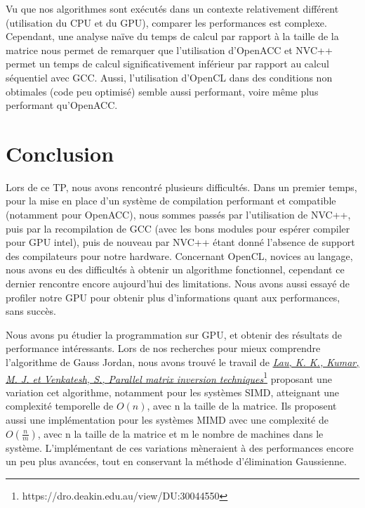 \documentclass[a4paper, french]{article}
\begin{document}
Vu que nos algorithmes sont exécutés dans un contexte relativement différent (utilisation du CPU et du GPU), comparer les performances est complexe. Cependant, une analyse naïve du temps de calcul par rapport à la taille de la matrice nous permet de remarquer que l'utilisation d'OpenACC et NVC++ permet un temps de calcul significativement inférieur par rapport au calcul séquentiel avec GCC. Aussi, l'utilisation d'OpenCL dans des conditions non obtimales (code peu optimisé) semble aussi performant, voire même plus performant qu'OpenACC.

\section{Conclusion}

Lors de ce TP, nous avons rencontré plusieurs difficultés. Dans un premier temps, pour la mise en place d'un système de compilation performant et compatible (notamment pour OpenACC), nous sommes passés par l'utilisation de NVC++, puis par la recompilation de GCC (avec les bons modules pour espérer compiler pour GPU intel), puis de nouveau par NVC++ étant donné l'absence de support des compilateurs pour notre hardware. Concernant OpenCL, novices au langage, nous avons eu des difficultés à obtenir un algorithme fonctionnel, cependant ce dernier rencontre encore aujourd'hui des limitations. Nous avons aussi essayé de profiler notre GPU pour obtenir plus d'informations quant aux performances, sans succès.

Nous avons  pu étudier la programmation sur GPU, et obtenir des résultats de performance intéressants.
Lors de nos recherches pour mieux comprendre l'algorithme de Gauss Jordan, nous avons trouvé le travail de \href{https://dro.deakin.edu.au/view/DU:30044550}{\textit{\underline{Lau, K. K., Kumar, M. J. et Venkatesh, S., Parallel matrix inversion techniques}}}\footnote{https://dro.deakin.edu.au/view/DU:30044550} proposant une variation cet algorithme, notamment pour les systèmes SIMD, atteignant une complexité temporelle de $O(n)$, avec n la taille de la matrice. Ils proposent aussi une implémentation pour les systèmes MIMD avec une complexité de $O(\frac{n}{m})$, avec n la taille de la matrice et m le nombre de machines dans le système. L'implémentant de ces variations mèneraient à des performances encore un peu plus avancées, tout en conservant la méthode d'élimination Gaussienne.
\end{document}
